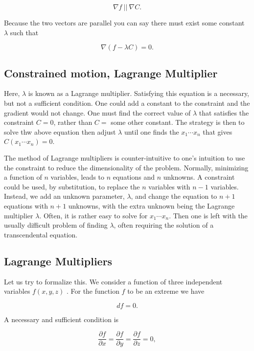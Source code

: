 \documentclass[%
oneside,                 %
final,                   %
10pt]{article}
\begin{document}
\begin{equation}
\nabla f ~||~ \nabla C.
\end{equation}

Because the two vectors are parallel you can say there must exist some
constant $\lambda$ such that

\begin{equation}
\nabla(f-\lambda C)=0.
\end{equation}

\subsection{Constrained motion, Lagrange Multiplier}

Here, $\lambda$ is known as a Lagrange multiplier. Satisfying
this equation  is a necessary, but not a sufficient
condition. One could add a constant to the constraint and the gradient
would not change. One must find the correct value of $\lambda$ that
satisfies the constraint $C=0$, rather than $C=$ some other
constant. The strategy is then to solve
thw above equation  then adjust $\lambda$ until one
finds the $x_1\cdots x_n$ that gives $C(x_1\cdots x_n)=0$.

The method of Lagrange multipliers is counter-intuitive to one's
intuition to use the constraint to reduce the dimensionality of the
problem. Normally, minimizing a function of $n$ variables, leads to
$n$ equations and $n$ unknowns. A constraint could be used, by
substitution, to replace the $n$ variables with $n-1$
variables. Instead, we add an unknown parameter, $\lambda$, and change
the equation to $n+1$ equations with $n+1$ unknowns, with the extra
unknown being the Lagrange multiplier $\lambda$. Often, it is rather
easy to solve for $x_1\cdots x_n$. Then one is left with the usually
difficult problem of finding $\lambda$, often requiring the solution
of a transcendental equation.

\subsection{Lagrange Multipliers}

Let us try to formalize this. We consider a function of three independent variables $f(x,y,z)$ . For
the function $f$ to be an extreme we have

\[
df=0.
\]

A necessary and sufficient condition is

\[
\frac{\partial f}{\partial x} =\frac{\partial f}{\partial y}=\frac{\partial f}{\partial z}=0,
\]
\end{document}
